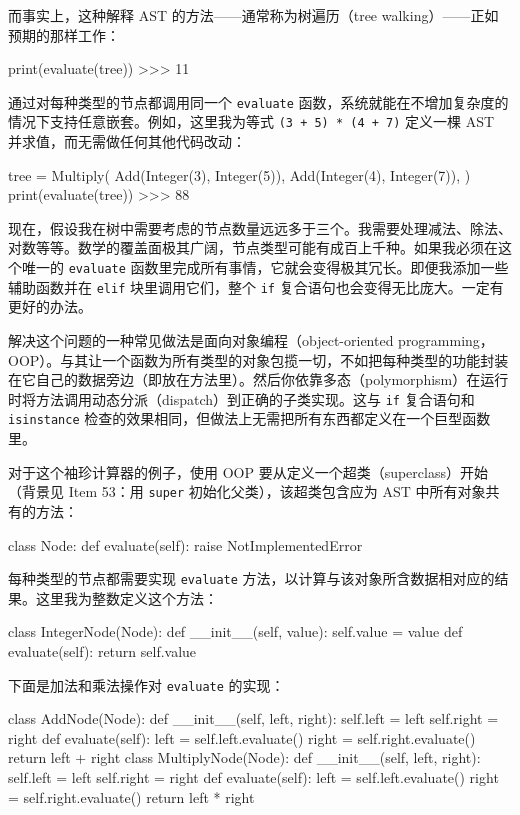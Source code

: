 而事实上，这种解释 AST 的方法——通常称为树遍历（tree walking）——正如预期的那样工作：

\begin{codebox}[python]
print(evaluate(tree))
>>>
11
\end{codebox}

通过对每种类型的节点都调用同一个 \texttt{evaluate} 函数，系统就能在不增加复杂度的情况下支持任意嵌套。例如，这里我为等式 \texttt{(3 + 5) * (4 + 7)} 定义一棵 AST 并求值，而无需做任何其他代码改动：

\begin{codebox}[python]
tree = Multiply(
    Add(Integer(3), Integer(5)),
    Add(Integer(4), Integer(7)),
)
print(evaluate(tree))
>>>
88
\end{codebox}

现在，假设我在树中需要考虑的节点数量远远多于三个。我需要处理减法、除法、对数等等。数学的覆盖面极其广阔，节点类型可能有成百上千种。如果我必须在这个唯一的 \texttt{evaluate} 函数里完成所有事情，它就会变得极其冗长。即便我添加一些辅助函数并在 \texttt{elif} 块里调用它们，整个 \texttt{if} 复合语句也会变得无比庞大。一定有更好的办法。

解决这个问题的一种常见做法是面向对象编程（object-oriented programming，OOP）。与其让一个函数为所有类型的对象包揽一切，不如把每种类型的功能封装在它自己的数据旁边（即放在方法里）。然后你依靠多态（polymorphism）在运行时将方法调用动态分派（dispatch）到正确的子类实现。这与 \texttt{if} 复合语句和 \texttt{isinstance} 检查的效果相同，但做法上无需把所有东西都定义在一个巨型函数里。

对于这个袖珍计算器的例子，使用 OOP 要从定义一个超类（superclass）开始（背景见 Item 53：用 \texttt{super} 初始化父类），该超类包含应为 AST 中所有对象共有的方法：

\begin{codebox}[python]
class Node:
    def evaluate(self):
        raise NotImplementedError
\end{codebox}

每种类型的节点都需要实现 \texttt{evaluate} 方法，以计算与该对象所含数据相对应的结果。这里我为整数定义这个方法：

\begin{codebox}[python]
class IntegerNode(Node):
    def __init__(self, value):
        self.value = value
    def evaluate(self):
        return self.value
\end{codebox}

下面是加法和乘法操作对 \texttt{evaluate} 的实现：

\begin{codebox}[python]
class AddNode(Node):
    def __init__(self, left, right):
        self.left = left
        self.right = right
    def evaluate(self):
        left = self.left.evaluate()
        right = self.right.evaluate()
        return left + right
class MultiplyNode(Node):
    def __init__(self, left, right):
        self.left = left
        self.right = right
    def evaluate(self):
        left = self.left.evaluate()
        right = self.right.evaluate()
        return left * right
\end{codebox}

